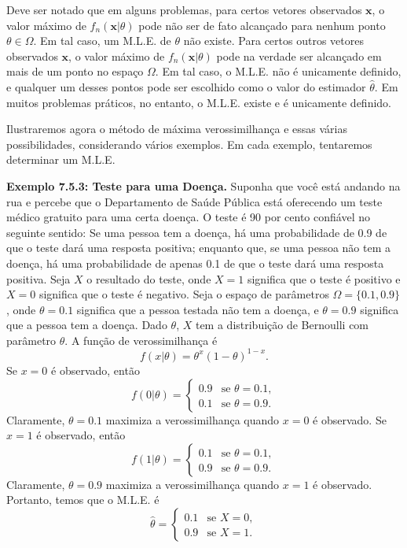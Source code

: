 \vspace{\baselineskip}

Deve ser notado que em alguns problemas, para certos vetores observados $\textbf{x}$, o valor máximo de $f_n(\textbf{x}|\theta)$ pode não ser de fato alcançado para nenhum ponto $\theta \in \Omega$. Em tal caso, um M.L.E. de $\theta$ não existe. Para certos outros vetores observados $\textbf{x}$, o valor máximo de $f_n(\textbf{x}|\theta)$ pode na verdade ser alcançado em mais de um ponto no espaço $\Omega$. Em tal caso, o M.L.E. não é unicamente definido, e qualquer um desses pontos pode ser escolhido como o valor do estimador $\hat{\theta}$. Em muitos problemas práticos, no entanto, o M.L.E. existe e é unicamente definido.

Ilustraremos agora o método de máxima verossimilhança e essas várias possibilidades, considerando vários exemplos. Em cada exemplo, tentaremos determinar um M.L.E.

\vspace{\baselineskip}

\textbf{Exemplo 7.5.3: Teste para uma Doença.} Suponha que você está andando na rua e percebe que o Departamento de Saúde Pública está oferecendo um teste médico gratuito para uma certa doença. O teste é 90 por cento confiável no seguinte sentido: Se uma pessoa tem a doença, há uma probabilidade de 0.9 de que o teste dará uma resposta positiva; enquanto que, se uma pessoa não tem a doença, há uma probabilidade de apenas 0.1 de que o teste dará uma resposta positiva. Seja $X$ o resultado do teste, onde $X=1$ significa que o teste é positivo e $X=0$ significa que o teste é negativo. Seja o espaço de parâmetros $\Omega = \{0.1, 0.9\}$, onde $\theta = 0.1$ significa que a pessoa testada não tem a doença, e $\theta = 0.9$ significa que a pessoa tem a doença. Dado $\theta$, $X$ tem a distribuição de Bernoulli com parâmetro $\theta$. A função de verossimilhança é
$$f(x|\theta) = \theta^x (1-\theta)^{1-x}.$$
Se $x=0$ é observado, então
$$ f(0|\theta) = \begin{cases} 0.9 & \text{se } \theta=0.1, \\ 0.1 & \text{se } \theta=0.9. \end{cases} $$
Claramente, $\theta=0.1$ maximiza a verossimilhança quando $x=0$ é observado. Se $x=1$ é observado, então
$$ f(1|\theta) = \begin{cases} 0.1 & \text{se } \theta=0.1, \\ 0.9 & \text{se } \theta=0.9. \end{cases} $$
Claramente, $\theta=0.9$ maximiza a verossimilhança quando $x=1$ é observado. Portanto, temos que o M.L.E. é
$$ \hat{\theta} = \begin{cases} 0.1 & \text{se } X=0, \\ 0.9 & \text{se } X=1. \end{cases} $$

